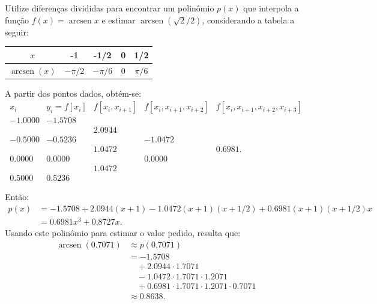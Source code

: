 \documentclass[12pt,a4paper]{article}
\newcommand*\arcsen{\operatorname{arcsen}}
\begin{document}
\begin{ExerciseList}
\Exercise[title={2,5}]
Utilize diferenças divididas para encontrar um polinômio $p(x)$ que interpola a função $f(x) = \arcsen{x}$ e estimar $\arcsen(\sqrt{2}/2)$, considerando a tabela a seguir:
\begin{center}
\begin{tabular}{|c|c|c|c|c|}
\hline
         $x$ & -1    & -1/2  & 0 &  1/2 \\
\hline
$\arcsen(x)$ & $-\pi/2$ & $-\pi/6$ & 0 & $\pi/6$ \\
\hline
\end{tabular}
\end{center}
\Answer A partir dos pontos dados, obtém-se:
\[
	\begin{array}{cccccc}
   x_i & y_i=f[x_i] & f[x_i,x_{i+1}] & f[x_i,x_{i+1},x_{i+2}]  & f[x_i,x_{i+1},x_{i+2},x_{i+3}] \\
   -1.0000 & \mathbf{-1.5708} \\
	    &            & \mathbf{2.0944} \\
   -0.5000 & -0.5236 &             & \mathbf{-1.0472}\\
	    &            & 1.0472 &              & \mathbf{0.6981}. \\
	0.0000 &  0.0000 &             & 0.0000\\
	    &            & 1.0472 \\
	0.5000 &  0.5236
	\end{array}
\]

Então:
\begin{align*}
p(x)
&=-1.5708
 +2.0944(x+1)
 -1.0472(x+1)(x+1/2)
 +0.6981(x+1)(x+1/2)x\\
& = 0.6981 x^3 + 0.8727 x.
\end{align*}
Usando este polinômio para estimar o valor pedido, resulta que:
\begin{align*}
\arcsen\left(0.7071\right)
& \approx p(0.7071) \\
& =-1.5708\\
& \quad +2.0944 \cdot 1.7071\\
& \quad -1.0472 \cdot 1.7071 \cdot 1.2071\\
& \quad +0.6981 \cdot 1.7071 \cdot 1.2071 \cdot 0.7071 \\
& \approx 0.8638.
\end{align*}


\end{ExerciseList}
\end{document}
